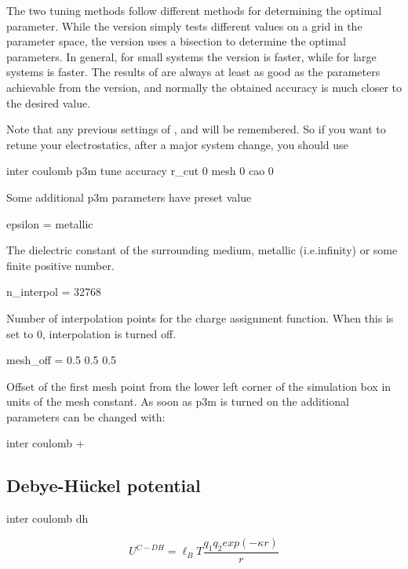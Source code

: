 The two tuning methods follow different methods for determining the
optimal parameter. While the  version simply tests
different values on a grid in the parameter space, the
 version uses a bisection to determine the optimal
parameters. In general, for small systems the  version
is faster, while for large systems  is faster. The
results of  are always at least as good as the
parameters achievable from the  version, and normally
the obtained accuracy is much closer to the desired value.

Note that any previous settings of ,  and
 will be remembered. So if you want to retune your
electrostatics, \eg after a major system change, you should use
\begin{code}
inter coulomb  p3m tune accuracy  r_cut 0 mesh 0 cao 0
\end{code}
Some additional p3m parameters have preset value
\begin{tclcode}
 epsilon = metallic 
\end{tclcode}
The dielectric constant of the surrounding medium, metallic
(i.e.infinity) or some finite positive number.
\begin{tclcode}
 n_interpol = 32768 
\end{tclcode}
Number of interpolation points for the charge assignment function.
When this is set to 0, interpolation is turned off.
\begin{tclcode}
 mesh_off = 0.5 0.5 0.5 
\end{tclcode}
Offset of the first mesh point from the lower left corner of the
simulation box in units of the mesh constant. As soon as p3m is turned
on the additional parameters can be changed with:
\begin{essyntaxbox}
inter coulomb  +
\end{essyntaxbox}


\subsection{Debye-H\"uckel potential}

\begin{essyntax}
  inter coulomb dh  
\end{essyntax}
\[ U^{C-DH} = \ell_B T \frac{q_1 q_2 exp(-\kappa r)}{r} \]

